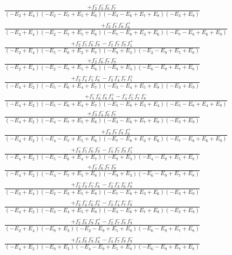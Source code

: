 \documentclass{article}
\begin{document}
\[\begin{array}{rcl}
\frac{+f_{2}^{-}f_{3}^{-}f_{6}^{-}f_{7}^{-}}{(-E_{2}+E_{4})(-E_{2}-E_{7}+E_{5}+E_{6})(-E_{3}-E_{6}+E_{7}+E_{8})(-E_{3}+E_{9})}\\
\frac{+f_{2}^{-}f_{7}^{-}f_{8}^{-}f_{6}^{+}}{(-E_{2}+E_{4})(-E_{2}-E_{7}+E_{5}+E_{6})(-E_{7}-E_{8}+E_{3}+E_{6})(-E_{7}-E_{8}+E_{6}+E_{9})}\\
\frac{+f_{2}^{-}f_{5}^{-}f_{6}^{-}f_{9}^{-}-f_{2}^{-}f_{7}^{-}f_{9}^{-}f_{5}^{+}}{(-E_{2}+E_{4})(-E_{5}-E_{6}+E_{2}+E_{7})(-E_{9}+E_{3})(-E_{2}-E_{9}+E_{5}+E_{8})}\\
\frac{+f_{2}^{-}f_{6}^{-}f_{7}^{-}f_{9}^{-}}{(-E_{2}+E_{4})(-E_{2}-E_{7}+E_{5}+E_{6})(-E_{9}+E_{3})(-E_{6}-E_{9}+E_{7}+E_{8})}\\
\frac{+f_{3}^{-}f_{4}^{-}f_{5}^{-}f_{6}^{-}-f_{3}^{-}f_{4}^{-}f_{7}^{-}f_{5}^{+}}{(-E_{4}+E_{2})(-E_{5}-E_{6}+E_{4}+E_{7})(-E_{3}-E_{4}+E_{5}+E_{8})(-E_{3}+E_{9})}\\
\frac{+f_{5}^{-}f_{6}^{-}f_{8}^{-}f_{4}^{+}-f_{4}^{-}f_{5}^{-}f_{7}^{-}f_{8}^{-}}{(-E_{4}+E_{2})(-E_{5}-E_{6}+E_{4}+E_{7})(-E_{5}-E_{8}+E_{3}+E_{4})(-E_{5}-E_{8}+E_{4}+E_{9})}\\
\frac{+f_{3}^{-}f_{4}^{-}f_{6}^{-}f_{7}^{-}}{(-E_{4}+E_{2})(-E_{4}-E_{7}+E_{5}+E_{6})(-E_{3}-E_{6}+E_{7}+E_{8})(-E_{3}+E_{9})}\\
\frac{+f_{4}^{-}f_{7}^{-}f_{8}^{-}f_{6}^{+}}{(-E_{4}+E_{2})(-E_{4}-E_{7}+E_{5}+E_{6})(-E_{7}-E_{8}+E_{3}+E_{6})(-E_{7}-E_{8}+E_{6}+E_{9})}\\
\frac{+f_{4}^{-}f_{5}^{-}f_{6}^{-}f_{9}^{-}-f_{4}^{-}f_{7}^{-}f_{9}^{-}f_{5}^{+}}{(-E_{4}+E_{2})(-E_{5}-E_{6}+E_{4}+E_{7})(-E_{9}+E_{3})(-E_{4}-E_{9}+E_{5}+E_{8})}\\
\frac{+f_{4}^{-}f_{6}^{-}f_{7}^{-}f_{9}^{-}}{(-E_{4}+E_{2})(-E_{4}-E_{7}+E_{5}+E_{6})(-E_{9}+E_{3})(-E_{6}-E_{9}+E_{7}+E_{8})}\\
\frac{+f_{2}^{-}f_{3}^{-}f_{7}^{-}f_{8}^{-}-f_{2}^{-}f_{3}^{-}f_{6}^{-}f_{8}^{+}}{(-E_{2}+E_{4})(-E_{2}-E_{3}+E_{5}+E_{8})(-E_{7}-E_{8}+E_{3}+E_{6})(-E_{3}+E_{9})}\\
\frac{+f_{3}^{-}f_{4}^{-}f_{6}^{-}f_{8}^{+}-f_{3}^{-}f_{4}^{-}f_{7}^{-}f_{8}^{-}}{(-E_{4}+E_{2})(-E_{3}-E_{4}+E_{5}+E_{8})(-E_{3}-E_{6}+E_{7}+E_{8})(-E_{3}+E_{9})}\\
\frac{+f_{2}^{-}f_{6}^{-}f_{9}^{-}f_{8}^{+}-f_{2}^{-}f_{7}^{-}f_{8}^{-}f_{9}^{-}}{(-E_{2}+E_{4})(-E_{9}+E_{3})(-E_{2}-E_{9}+E_{5}+E_{8})(-E_{6}-E_{9}+E_{7}+E_{8})}\\
\frac{+f_{4}^{-}f_{6}^{-}f_{9}^{-}f_{8}^{+}-f_{4}^{-}f_{7}^{-}f_{8}^{-}f_{9}^{-}}{(-E_{4}+E_{2})(-E_{9}+E_{3})(-E_{4}-E_{9}+E_{5}+E_{8})(-E_{6}-E_{9}+E_{7}+E_{8})}\\

\end{array}\]
\end{document}
